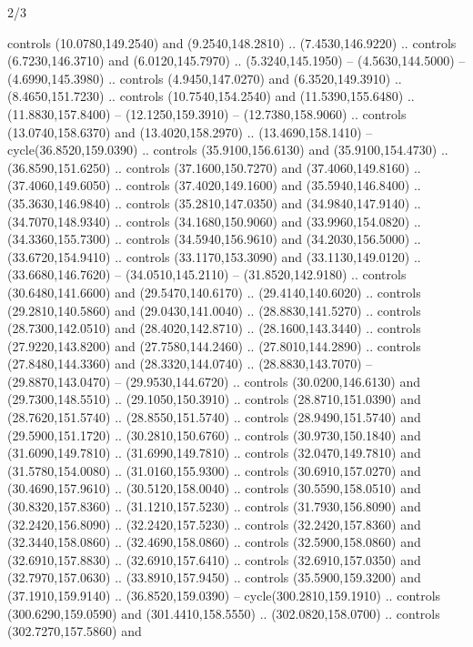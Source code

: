 \begin{flagdescription}{2/3}
\begin{scope}[xshift=0.5\flaglength,yshift=0.5\flagwidth,scale=\stretchfactor]
\begin{scope}[scale=0.001645\flagwidth,yshift=65mm,xshift=-63mm]
\begin{scope}[y=0.80pt, x=0.80pt, yscale=-1,]
\begin{scope}[cm={{1.33333,0.0,0.0,1.33333,(0.0,1e-05)}}]
  controls (10.0780,149.2540) and (9.2540,148.2810) .. (7.4530,146.9220) ..
  controls (6.7230,146.3710) and (6.0120,145.7970) .. (5.3240,145.1950) --
  (4.5630,144.5000) -- (4.6990,145.3980) .. controls (4.9450,147.0270) and
  (6.3520,149.3910) .. (8.4650,151.7230) .. controls (10.7540,154.2540) and
  (11.5390,155.6480) .. (11.8830,157.8400) -- (12.1250,159.3910) --
  (12.7380,158.9060) .. controls (13.0740,158.6370) and (13.4020,158.2970) ..
  (13.4690,158.1410) -- cycle(36.8520,159.0390) .. controls (35.9100,156.6130)
  and (35.9100,154.4730) .. (36.8590,151.6250) .. controls (37.1600,150.7270)
  and (37.4060,149.8160) .. (37.4060,149.6050) .. controls (37.4020,149.1600)
  and (35.5940,146.8400) .. (35.3630,146.9840) .. controls (35.2810,147.0350)
  and (34.9840,147.9140) .. (34.7070,148.9340) .. controls (34.1680,150.9060)
  and (33.9960,154.0820) .. (34.3360,155.7300) .. controls (34.5940,156.9610)
  and (34.2030,156.5000) .. (33.6720,154.9410) .. controls (33.1170,153.3090)
  and (33.1130,149.0120) .. (33.6680,146.7620) -- (34.0510,145.2110) --
  (31.8520,142.9180) .. controls (30.6480,141.6600) and (29.5470,140.6170) ..
  (29.4140,140.6020) .. controls (29.2810,140.5860) and (29.0430,141.0040) ..
  (28.8830,141.5270) .. controls (28.7300,142.0510) and (28.4020,142.8710) ..
  (28.1600,143.3440) .. controls (27.9220,143.8200) and (27.7580,144.2460) ..
  (27.8010,144.2890) .. controls (27.8480,144.3360) and (28.3320,144.0740) ..
  (28.8830,143.7070) -- (29.8870,143.0470) -- (29.9530,144.6720) .. controls
  (30.0200,146.6130) and (29.7300,148.5510) .. (29.1050,150.3910) .. controls
  (28.8710,151.0390) and (28.7620,151.5740) .. (28.8550,151.5740) .. controls
  (28.9490,151.5740) and (29.5900,151.1720) .. (30.2810,150.6760) .. controls
  (30.9730,150.1840) and (31.6090,149.7810) .. (31.6990,149.7810) .. controls
  (32.0470,149.7810) and (31.5780,154.0080) .. (31.0160,155.9300) .. controls
  (30.6910,157.0270) and (30.4690,157.9610) .. (30.5120,158.0040) .. controls
  (30.5590,158.0510) and (30.8320,157.8360) .. (31.1210,157.5230) .. controls
  (31.7930,156.8090) and (32.2420,156.8090) .. (32.2420,157.5230) .. controls
  (32.2420,157.8360) and (32.3440,158.0860) .. (32.4690,158.0860) .. controls
  (32.5900,158.0860) and (32.6910,157.8830) .. (32.6910,157.6410) .. controls
  (32.6910,157.0350) and (32.7970,157.0630) .. (33.8910,157.9450) .. controls
  (35.5900,159.3200) and (37.1910,159.9140) .. (36.8520,159.0390) --
  cycle(300.2810,159.1910) .. controls (300.6290,159.0590) and
  (301.4410,158.5550) .. (302.0820,158.0700) .. controls (302.7270,157.5860) and

\end{scope}
\end{scope}
\end{scope}
\end{scope}
\end{flagdescription}
